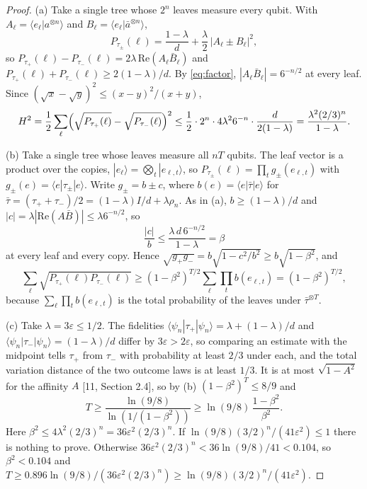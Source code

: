 \documentclass[11pt]{article}
\theoremstyle{remark}
\newcommand{\eps}{\varepsilon}
\newcommand{\ket}[1]{|#1\rangle}
\newcommand{\bra}[1]{\langle #1|}
\newcommand{\abar}{\bar a}
\begin{document}
\begin{proof}
(a) Take a single tree whose $2^n$ leaves measure every qubit. With $A_\ell = \langle e_\ell|a^{\otimes n}\rangle$ and $B_\ell = \langle e_\ell|\abar^{\otimes n}\rangle$,
\[
P_{\tau_\pm}(\ell) = \frac{1-\lambda}{d} + \frac\lambda2\,|A_\ell\pm B_\ell|^2,
\]
so $P_{\tau_+}(\ell)-P_{\tau_-}(\ell) = 2\lambda\,\mathrm{Re}(A_\ell\bar B_\ell)$ and $P_{\tau_+}(\ell)+P_{\tau_-}(\ell)\ge 2(1-\lambda)/d$. By \eqref{eq:factor}, $|A_\ell\bar B_\ell| = 6^{-n/2}$ at every leaf. Since $(\sqrt x-\sqrt y)^2\le(x-y)^2/(x+y)$,
\[
H^2 = \frac12\sum_\ell\Bigl(\sqrt{P_{\tau_+}(\ell)}-\sqrt{P_{\tau_-}(\ell)}\Bigr)^2 \le \frac12\cdot 2^n\cdot 4\lambda^2 6^{-n}\cdot\frac{d}{2(1-\lambda)} = \frac{\lambda^2(2/3)^n}{1-\lambda}.
\]

(b) Take a single tree whose leaves measure all $nT$ qubits. The leaf vector is a product over the copies, $\ket{e_\ell} = \bigotimes_t\ket{e_{\ell,t}}$, so $P_{\tau_\pm}(\ell) = \prod_t g_\pm(e_{\ell,t})$ with $g_\pm(e) = \bra e\tau_\pm\ket e$. Write $g_\pm = b\pm c$, where $b(e) = \bra e\bar\tau\ket e$ for $\bar\tau = (\tau_++\tau_-)/2 = (1-\lambda)I/d + \lambda\rho_n$. As in (a), $b\ge(1-\lambda)/d$ and $|c| = \lambda|\mathrm{Re}(A\bar B)|\le\lambda6^{-n/2}$, so
\[
\frac{|c|}{b}\le\frac{\lambda\, d\, 6^{-n/2}}{1-\lambda} = \beta
\]
at every leaf and every copy. Hence $\sqrt{g_+g_-} = b\sqrt{1-c^2/b^2}\ge b\sqrt{1-\beta^2}$, and
\[
\sum_\ell\sqrt{P_{\tau_+}(\ell)P_{\tau_-}(\ell)} \ge (1-\beta^2)^{T/2}\sum_\ell\prod_t b(e_{\ell,t}) = (1-\beta^2)^{T/2},
\]
because $\sum_\ell\prod_t b(e_{\ell,t})$ is the total probability of the leaves under $\bar\tau^{\otimes T}$.

(c) Take $\lambda = 3\eps\le1/2$. The fidelities $\bra{\psi_n}\tau_+\ket{\psi_n} = \lambda+(1-\lambda)/d$ and $\bra{\psi_n}\tau_-\ket{\psi_n} = (1-\lambda)/d$ differ by $3\eps>2\eps$, so comparing an estimate with the midpoint tells $\tau_+$ from $\tau_-$ with probability at least $2/3$ under each, and the total variation distance of the two outcome laws is at least $1/3$. It is at most $\sqrt{1-A^2}$ for the affinity $A$ [11, Section 2.4], so by (b) $(1-\beta^2)^T\le8/9$ and
\[
T\ge\frac{\ln(9/8)}{\ln(1/(1-\beta^2))}\ge\ln(9/8)\,\frac{1-\beta^2}{\beta^2}.
\]
Here $\beta^2\le4\lambda^2(2/3)^n = 36\eps^2(2/3)^n$. If $\ln(9/8)(3/2)^n/(41\eps^2)\le1$ there is nothing to prove. Otherwise $36\eps^2(2/3)^n<36\ln(9/8)/41<0.104$, so $\beta^2<0.104$ and $T\ge 0.896\ln(9/8)/(36\eps^2(2/3)^n)\ge\ln(9/8)(3/2)^n/(41\eps^2)$.
\end{proof}
\end{document}
